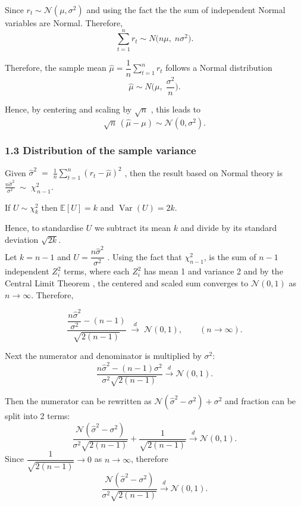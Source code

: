 \documentclass[
  12pt,
]{article}
\begin{document}
Since \(r_t\sim \mathcal{N}(\mu,\sigma^2)\) and using the fact the the
sum of independent Normal variables are Normal. Therefore,\[
\sum_{t=1}^n r_t \sim N\!\big(n\mu,\; n\sigma^2\big). \tag{1}
\]

Therefore, the sample mean \(\widehat\mu=\dfrac{1}{n}\sum_{t=1}^n r_t\)
follows a Normal distribution \[
\widehat\mu \sim N\!\Big(\mu,\; \frac{\sigma^2}{n}\Big). \tag{2}
\]

Hence, by centering and scaling by \(\sqrt{n}\) , this leads to \[
\sqrt{n}\,(\widehat\mu-\mu) \sim \mathcal{N}(0,\sigma^2). \tag{3}
\]

\subsubsection{1.3 Distribution of the sample
variance}\label{distribution-of-the-sample-variance}

Given
\(\widehat\sigma^2 \;=\; \frac{1}{n}\sum_{t=1}^n (r_t - \widehat\mu)^2\)
, then the result based on Normal theory is
\(\frac{n\widehat\sigma^2}{\sigma^2} \;\sim\; \chi^2_{\,n-1}.\)

If \(U \sim \chi^2_k\) then \(\mathbb{E}[U]=k\) and
\(\operatorname{Var}(U)=2k.\)

Hence, to standardise \(U\) we subtract its mean \(k\) and divide by its
standard deviation \(\sqrt{2k}\).\\
Let \(k=n-1\) and \(U = \dfrac{n\widehat\sigma^2}{\sigma^2}\) . Using
the fact that \(\chi_{n-1}^2\), is the sum of \(n-1\) independent
\(Z_i^2\) terms, where each \(Z_i^2\) has mean 1 and variance 2 and by
the Central Limit Theorem , the centered and scaled sum converges to
\(\mathcal{N}(0,1)\) as \(n \to \infty\). Therefore,

\[
\frac{\dfrac{n\widehat\sigma^2}{\sigma^2}-(n-1)}{\sqrt{2(n-1)}} \;\xrightarrow{d}\; \mathcal{N}(0,1), \qquad (n\to\infty)   \tag{4}.
\]

Next the numerator and denominator is multiplied by \(\sigma^2\): \[
\frac{n\widehat\sigma^2-(n-1)\sigma^2}{\sigma^2\sqrt{2(n-1)}} \xrightarrow{d} \mathcal{N}(0,1) \tag{5}.
\]

Then the numerator can be rewritten as
\(\mathcal{N}(\widehat\sigma^2-\sigma^2)+\sigma^2\) and fraction can be
split into 2 terms: \[
\frac{\mathcal{N}(\widehat\sigma^2-\sigma^2)}{\sigma^2\sqrt{2(n-1)}} + \frac{1}{\sqrt{2(n-1)}} \xrightarrow{d} \mathcal{N}(0,1) \tag{6}.
\] Since \(\dfrac{1}{\sqrt{2(n-1)}}\to 0\) as \(n\to\infty\), therefore
\[
\frac{\mathcal{N}(\widehat\sigma^2-\sigma^2)}{\sigma^2\sqrt{2(n-1)}} \xrightarrow{d} \mathcal{N}(0,1) \tag{7}.
\]
\end{document}

